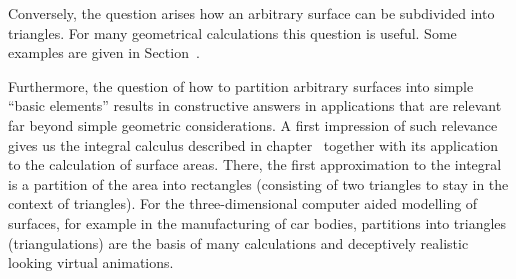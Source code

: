 \begin{MIntro}
Conversely, the question arises how an arbitrary surface can be subdivided into triangles. 
For many geometrical calculations this question is useful. 
Some examples are given in Section~.

Furthermore, the question of how to partition arbitrary surfaces into simple 
``basic elements'' results in constructive answers in applications that are relevant 
far beyond simple geometric considerations. A first impression of such relevance gives 
us the integral calculus described in chapter~ together with its application 
to the calculation of surface areas. There, the first approximation to the integral is 
a partition of the area into rectangles (consisting of two triangles to stay in the 
context of triangles). For the three-dimensional computer aided modelling of surfaces,
for example in the manufacturing of car bodies, partitions into triangles 
(triangulations) are the basis of many calculations and deceptively realistic 
looking virtual animations. 
\end{MIntro}


